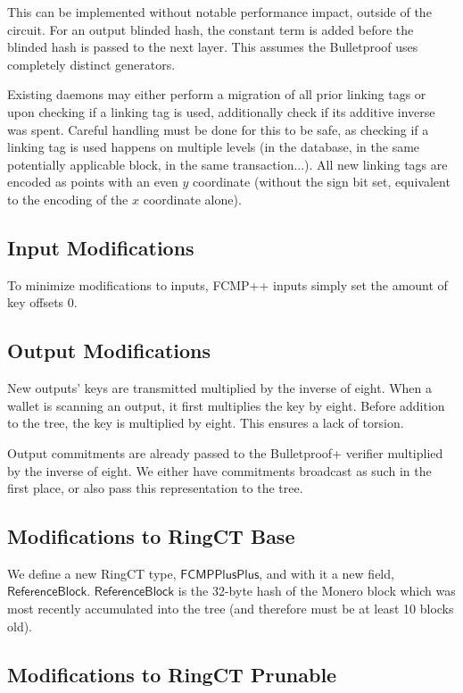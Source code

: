 \documentclass[]{article}
\begin{document}
This can be implemented without notable performance impact, outside of the circuit. For an output blinded hash, the constant term is added before the blinded hash is passed to the next layer. This assumes the Bulletproof uses completely distinct generators.

Existing daemons may either perform a migration of all prior linking tags or upon checking if a linking tag is used, additionally check if its additive inverse was spent. Careful handling must be done for this to be safe, as checking if a linking tag is used happens on multiple levels (in the database, in the same potentially applicable block, in the same transaction...). All new linking tags are encoded as points with an even $y$ coordinate (without the sign bit set, equivalent to the encoding of the $x$ coordinate alone).

\subsection{Input Modifications}

To minimize modifications to inputs, FCMP++ inputs simply set the amount of key offsets 0.

\subsection{Output Modifications}

New outputs' keys are transmitted multiplied by the inverse of eight. When a wallet is scanning an output, it first multiplies the key by eight. Before addition to the tree, the key is multiplied by eight. This ensures a lack of torsion.

Output commitments are already passed to the Bulletproof+ verifier multiplied by the inverse of eight. We either have commitments broadcast as such in the first place, or also pass this representation to the tree.

\subsection{Modifications to RingCT Base}

We define a new RingCT type, $\mathsf{FCMPPlusPlus}$, and with it a new field, $\mathsf{ReferenceBlock}$. $\mathsf{ReferenceBlock}$ is the 32-byte hash of the Monero block which was most recently accumulated into the tree (and therefore must be at least 10 blocks old).

\subsection{Modifications to RingCT Prunable}
\end{document}
